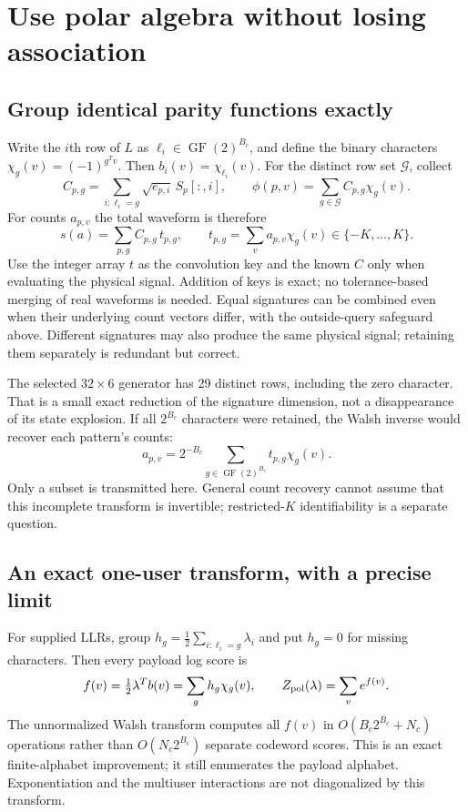 \documentclass[10pt,a4paper]{article}
\newcommand{\GF}{\operatorname{GF}}
\begin{document}
\clearpage
\section{Use polar algebra without losing association}
\label{sec:polar-exact}
\subsection{Group identical parity functions exactly}
Write the $i$th row of $L$ as $\ell_i\in\GF(2)^{B_c}$, and define the binary characters
$\chi_g(v)=(-1)^{g^Tv}$. Then $b_i(v)=\chi_{\ell_i}(v)$.
For the distinct row set $\mathcal G$, collect
\[
 C_{p,g}=\sum_{i:\ell_i=g}\sqrt{e_{p,i}}\,S_p[:,i],
 \qquad
 \phi(p,v)=\sum_{g\in\mathcal G}C_{p,g}\chi_g(v).
\]
For counts $a_{p,v}$ the total waveform is therefore
\begin{equation}
 s(a)=\sum_{p,g}C_{p,g}\,t_{p,g},\qquad
 t_{p,g}=\sum_v a_{p,v}\chi_g(v)\in\{-K,\ldots,K\}.
 \label{eq:integer-signature}
\end{equation}
Use the integer array $t$ as the convolution key and the known $C$ only when evaluating the physical signal.
Addition of keys is exact; no tolerance-based merging of real waveforms is needed. Equal signatures can be
combined even when their underlying count vectors differ, with the outside-query safeguard above.
Different signatures may also produce the same physical signal; retaining them separately is redundant but correct.

The selected $32\times6$ generator has 29 distinct rows, including the zero character. That is a small exact
reduction of the signature dimension, not a disappearance of its state explosion.
If all $2^{B_c}$ characters were retained, the Walsh inverse would recover each pattern's counts:
\[
 a_{p,v}=2^{-B_c}\sum_{g\in\GF(2)^{B_c}}t_{p,g}\chi_g(v).
\]
Only a subset is transmitted here. General count recovery cannot assume that this incomplete transform is
invertible; restricted-$K$ identifiability is a separate question.

\subsection{An exact one-user transform, with a precise limit}
For supplied LLRs, group $h_g=\tfrac12\sum_{i:\ell_i=g}\lambda_i$ and put $h_g=0$ for missing characters.
Then every payload log score is
\[
 f(v)=\tfrac12\lambda^Tb(v)=\sum_g h_g\chi_g(v),\qquad
 Z_{\rm pol}(\lambda)=\sum_v e^{f(v)}.
\]
The unnormalized Walsh transform computes all $f(v)$ in $O(B_c2^{B_c}+N_c)$ operations rather than
$O(N_c2^{B_c})$ separate codeword scores. This is an exact finite-alphabet improvement; it still enumerates
the payload alphabet. Exponentiation and the multiuser interactions are not diagonalized by this transform.
\end{document}
